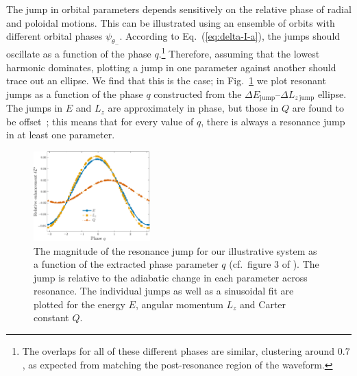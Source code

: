 \documentclass[aps,prd,amsfonts,amssymb,amsmath,nofootinbib,showpacs,superscriptaddress,twocolumn,floatfix]{revtex4-1}
\newcommand{\eqnref}[1]{Eq.~(\ref{eq:#1})}
\newcommand{\figref}[1]{Fig.~\ref{fig:#1}}
\newcommand{\sub}[1]{\ensuremath{_\mathrm{#1}}}
\begin{document}
The jump in orbital parameters depends sensitively on the relative phase of radial and poloidal motions. This can be illustrated using an ensemble of orbits with different orbital phases $\psi_{\theta_-}$. According to \eqnref{delta-I-a}, the jumps should oscillate as a function of the phase $q$.\footnote{The overlaps for all of these different phases are similar, clustering around $0.7$, as expected from matching the post-resonance region of the waveform.} Therefore, assuming that the lowest harmonic dominates, plotting a jump in one parameter against another should trace out an ellipse. We find that this is the case; in \figref{resjump-vs-q} we plot resonant jumps as a function of the phase $q$ constructed from the $\Delta E\sub{jump}$--$\Delta L_{z\,\mathrm{jump}}$ ellipse. The jumps in $E$ and $L_z$ are approximately in phase, but those in $Q$ are found to be offset~\cite{Flanagan2012a}; this means that for every value of $q$, there is always a resonance jump in at least one parameter.

\begin{figure}
\centering
\includegraphics[width=0.4\textwidth]{Fig_q_jump}
\caption{\label{fig:resjump-vs-q}The magnitude of the resonance jump for our illustrative system as a function of the extracted phase parameter $q$ (cf.\ figure 3 of \cite{Flanagan2012a}). The jump is relative to the adiabatic change in each parameter across resonance. The individual jumps as well as a sinusoidal fit are plotted for the energy $E$, angular momentum $L_z$ and Carter constant $Q$.}
\end{figure}

\end{document}
